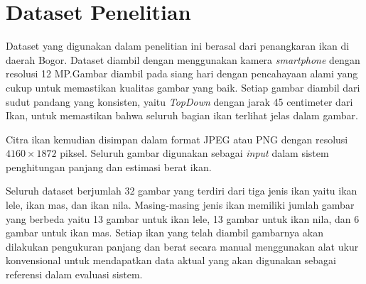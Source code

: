 


\section{Dataset Penelitian}
    Dataset yang digunakan dalam penelitian ini berasal dari penangkaran ikan di daerah Bogor. Dataset diambil dengan menggunakan kamera \emph{smartphone} dengan resolusi 12 MP.\@ Gambar diambil pada siang hari dengan pencahayaan alami yang cukup untuk memastikan kualitas gambar yang baik.
Setiap gambar diambil dari sudut pandang yang konsisten, yaitu \emph{TopDown} dengan jarak 45 centimeter dari Ikan, untuk memastikan bahwa seluruh bagian ikan terlihat jelas dalam gambar. 

Citra ikan kemudian disimpan dalam format JPEG atau PNG dengan resolusi \(4160 \times 1872\) piksel. Seluruh gambar digunakan sebagai \emph{input} dalam sistem penghitungan panjang dan estimasi berat ikan.

Seluruh dataset berjumlah 32 gambar yang terdiri dari tiga jenis ikan yaitu ikan lele, ikan mas, dan ikan nila. Masing-masing jenis ikan memiliki jumlah gambar yang berbeda yaitu 13 gambar untuk ikan lele, 13 gambar untuk ikan nila, dan 6 gambar untuk ikan mas.
Setiap ikan yang telah diambil gambarnya akan dilakukan pengukuran panjang dan berat secara manual menggunakan alat ukur konvensional untuk mendapatkan data aktual yang akan digunakan sebagai referensi dalam evaluasi sistem. 

